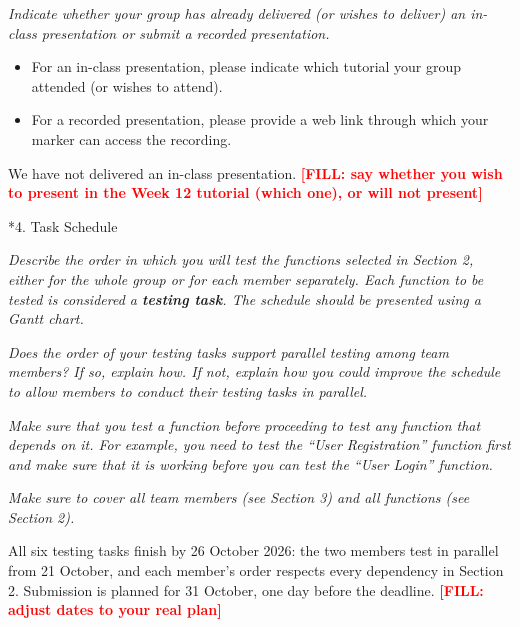 \documentclass[11pt,a4paper]{article}
\makeatletter
\renewcommand\section{\@startsection{section}{1}{0pt}{3ex plus 1ex}{1.2ex}{\LARGE\bfseries}}
\newcommand{\instr}[1]{{\color{utsblue}\itshape #1\par}}
\newcommand{\FILL}[1]{\textcolor{red}{\textbf{[FILL: #1]}}}
\makeatother
\begin{document}
\vspace{-1ex}
\instr{Indicate whether your group has already delivered (or wishes to deliver) an in-class presentation or submit a recorded presentation.}
{\color{utsblue}\itshape
\begin{itemize}[topsep=0pt]
  \item For an in-class presentation, please indicate which tutorial your group attended (or wishes to attend).
  \item For a recorded presentation, please provide a web link through which your marker can access the recording.
\end{itemize}}

We have not delivered an in-class presentation. \FILL{say whether you wish to present in the Week 12 tutorial (which one), or will not present}

\section*{4. Task Schedule}
\instr{Describe the order in which you will test the functions selected in Section 2, either for the whole group or for each member separately. Each function to be tested is considered a \textbf{testing task}. The schedule should be presented using a Gantt chart.}
\instr{Does the order of your testing tasks support parallel testing among team members? If so, explain how. If not, explain how you could improve the schedule to allow members to conduct their testing tasks in parallel.}
\instr{Make sure that you test a function before proceeding to test any function that depends on it. For example, you need to test the ``User Registration'' function first and make sure that it is working before you can test the ``User Login'' function.}
\instr{Make sure to cover all team members (see Section 3) and all functions (see Section 2).}

All six testing tasks finish by 26 October 2026: the two members test in parallel from 21 October, and each member's order respects every dependency in Section 2. Submission is planned for 31 October, one day before the deadline. \FILL{adjust dates to your real plan}
\end{document}
